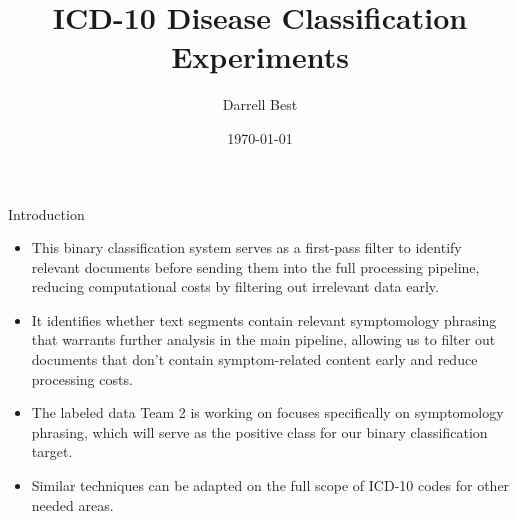 \documentclass[
    10pt,
    aspectratio=169,
]{beamer}
\title[ICD-10 Classification]{ICD-10 Disease Classification Experiments}
\author[D. Best]{Darrell Best}
\date{\today}
\institute[ISI]{Information Sciences Institute \\ 
University of Southern California }
\begin{document}
\section{}
\begin{frame}
	\titlepage %
\end{frame}







\begin{frame}{Introduction}
\begin{itemize}
    \item This binary classification system serves as a first-pass filter to identify relevant documents before sending them into the full processing pipeline, reducing computational costs by filtering out irrelevant data early.
    \item It identifies whether text segments contain relevant symptomology phrasing that warrants further analysis in the main pipeline, allowing us to filter out documents that don't contain symptom-related content early and reduce processing costs.
    \item The labeled data Team 2 is working on focuses specifically on symptomology phrasing, which will serve as the positive class for our binary classification target.
    \item Similar techniques can be adapted on the full scope of ICD-10 codes for other needed areas.
\end{itemize}
\end{frame}
\end{document}
